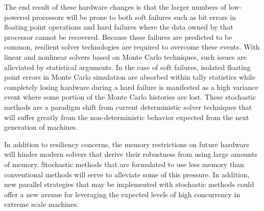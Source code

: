The end result of these hardware changes is that the larger numbers of
low-powered processors will be prone to both soft failures such as bit
errors in floating point operations and hard failures where the data
owned by that processor cannot be recovered. Because these failures
are predicted to be common, resilient solver technologies are required
to overcome these events. With linear and nonlinear solvers based on
Monte Carlo techniques, such issues are alleviated by statistical
arguments. In the case of soft failures, isolated floating point
errors in Monte Carlo simulation are absorbed within tally statistics
while completely losing hardware during a hard failure is manifested
as a high variance event where some portion of the Monte Carlo
histories are lost. These stochastic methods are a paradigm shift from
current deterministic solver techniques that will suffer greatly from
the non-deterministic behavior expected from the next generation of
machines.

In addition to resiliency concerns, the memory restrictions on future
hardware will hinder modern solvers that derive their robustness from
using large amounts of memory. Stochastic methods that are formulated
to use less memory than conventional methods will serve to alleviate
some of this pressure. In addition, new parallel strategies that may
be implemented with stochastic methods could offer a new avenue for
leveraging the expected levels of high concurrency in extreme scale
machines.

